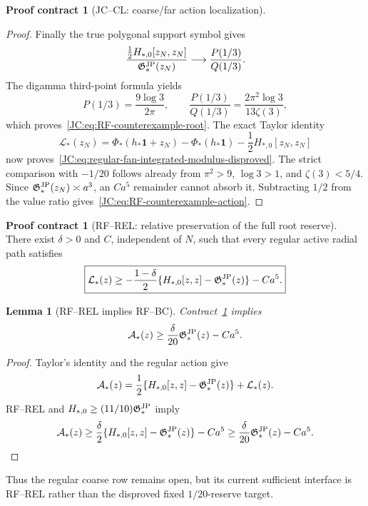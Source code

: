 \documentclass[11pt]{amsart}
\providecommand{\mathscr}{\mathcal}
\numberwithin{equation}{section}
\newtheorem{lemma}[theorem]{Lemma}
\theoremstyle{definition}
\newtheorem{contract}[theorem]{Proof contract}
\theoremstyle{remark}
\newcommand{\Gjp}{\mathfrak G^{\rm JP}}
\providecommand{\mathscr}[1]{\mathcal{#1}}
\begin{document}
\begin{contract}[JC--CL: coarse/far action localization]
\begin{proof}
Finally the true polygonal support symbol gives
\[
 \frac{\frac12H_{*,0}[z_N,z_N]}{\Gjp_*(z_N)}
 \longrightarrow\frac{P(1/3)}{Q(1/3)}.
\]
The digamma third-point formula yields
\[
 P(1/3)=\frac{9\log3}{2\pi},\qquad
 \frac{P(1/3)}{Q(1/3)}
 =\frac{2\pi^2\log3}{13\zeta(3)},
\]
which proves~\eqref{JC:eq:RF-counterexample-root}.  The exact Taylor identity
\[
 \mathcal L_*(z_N)
 =\Phi_*(h_*\mathbf1+z_N)-\Phi_*(h_*\mathbf1)
 -\frac12H_{*,0}[z_N,z_N]
\]
now proves~\eqref{JC:eq:regular-fan-integrated-modulus-disproved}.  The strict
comparison with \(-1/20\) follows already from
\(\pi^2>9\), \(\log3>1\), and \(\zeta(3)<5/4\).  Since
\(\Gjp_*(z_N)\asymp a^3\), an \(Ca^5\) remainder cannot absorb it.
Subtracting \(1/2\) from the value ratio gives~\eqref{JC:eq:RF-counterexample-action}.
\end{proof}

\begin{contract}[RF--REL: relative preservation of the full root reserve]
\label{JC:con:RF-relative-root-reserve}
There exist \(\delta>0\) and \(C\), independent of \(N\), such that every
regular active radial path satisfies
\begin{equation}\label{JC:eq:RF-relative-root-reserve}
 \boxed{\mathcal L_*(z)\ge-\frac{1-\delta}{2}
 \{H_{*,0}[z,z]-\Gjp_*(z)\}-Ca^5.}
\end{equation}
\end{contract}

\begin{lemma}[RF--REL implies RF--BC]
\label{JC:lem:RF-relative-implies-Bregman}
Contract~\ref{JC:con:RF-relative-root-reserve} implies
\[
 \mathscr A_*(z)\ge\frac{\delta}{20}\Gjp_*(z)-Ca^5.
\]
\end{lemma}

\begin{proof}
Taylor's identity and the regular action give
\[
 \mathscr A_*(z)
 =\frac12\{H_{*,0}[z,z]-\Gjp_*(z)\}+\mathcal L_*(z).
\]
RF--REL and
\(H_{*,0}\ge(11/10)\Gjp_*\) imply
\[
 \mathscr A_*(z)
 \ge\frac{\delta}{2}\{H_{*,0}[z,z]-\Gjp_*(z)\}-Ca^5
 \ge\frac{\delta}{20}\Gjp_*(z)-Ca^5.
\]
\end{proof}

Thus the regular coarse row remains open, but its current sufficient
interface is RF--REL rather than the disproved fixed \(1/20\)-reserve
target.


\end{contract}
\end{document}
